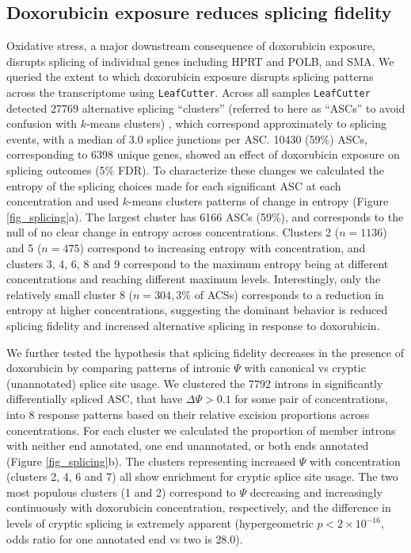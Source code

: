 \documentclass{article}
\begin{document}
{\subsection*{Doxorubicin exposure reduces splicing fidelity}


Oxidative stress, a major downstream consequence of doxorubicin exposure, disrupts splicing of individual genes including HPRT and POLB\cite{Disher2007}, and SMA\cite{Seo2016}. We queried the extent to which doxorubicin exposure disrupts splicing patterns across the transcriptome using \texttt{LeafCutter}\cite{LeafCutter}. Across all samples \texttt{LeafCutter} detected 27769 alternative splicing ``clusters'' (referred to here as ``ASCs'' to avoid confusion with $k$-means clusters) , which correspond approximately to splicing events, with a median of 3.0 splice junctions per ASC. 10430 (59\%) ASCs, corresponding to 6398 unique genes, showed an effect of doxorubicin exposure on splicing outcomes (5\% FDR). To characterize these changes we calculated the entropy of the splicing choices made for each significant ASC at each concentration and used $k$-means clusters patterns of change in entropy (Figure \ref{fig_splicing}a). The largest cluster has 6166 ASCs (59\%), and corresponds to the null of no clear change in entropy across concentrations. Clusters 2 ($n=1136$) and 5 ($n=475$) correspond to increasing entropy with concentration, and clusters 3, 4, 6, 8 and 9 correspond to the maximum entropy being at different concentrations and reaching different maximum levels. Interestingly, only the relatively small cluster 8 ($n=304, 3\%$ of ACSs) corresponds to a reduction in entropy at higher  concentrations, suggesting the dominant behavior is reduced splicing fidelity and increased alternative splicing in response to doxorubicin. 

We further tested the hypothesis that splicing fidelity decreases in the presence of doxorubicin by comparing patterns of intronic $\Psi$ with canonical vs cryptic (unannotated) splice site usage. We clustered the 7792 introns in significantly differentially spliced ASC, that have $\Delta \Psi > 0.1$ for some pair of concentrations, into 8 response patterns based on their relative excision proportions across concentrations. For each cluster we calculated the proportion of member introns with neither end annotated, one end unannotated, or both ends annotated (Figure \ref{fig_splicing}b). The clusters representing increased $\Psi$ with concentration (clusters 2, 4, 6 and 7) all show enrichment for cryptic splice site usage. The two most populous clusters (1 and 2) correspond to $\Psi$ decreasing and increasingly continuously with doxorubicin concentration, respectively, and the difference in levels of cryptic splicing is extremely apparent (hypergeometric $p < 2 \times 10^{-16}$, odds ratio for one annotated end vs two is $28.0$).

}
\end{document}
